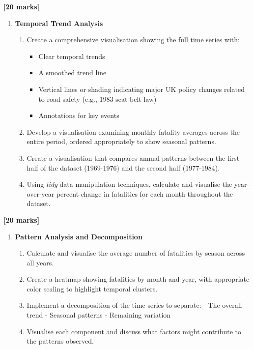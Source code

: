\documentclass[
  10t,
]{article}
\providecommand{\tightlist}{%
  \setlength{\itemsep}{0pt}\setlength{\parskip}{0pt}}\usepackage{longtable,booktabs,array}
\begin{document}
\textbf{{[}20 marks{]}}

\begin{enumerate}
\def\labelenumi{\alph{enumi}.}
\setcounter{enumi}{1}
\tightlist
\item
  \textbf{Temporal Trend Analysis}

  \begin{enumerate}
  \def\labelenumii{\roman{enumii}.}
  \tightlist
  \item
    Create a comprehensive visualisation showing the full time series
    with:

    \begin{itemize}
    \tightlist
    \item
      Clear temporal trends
    \item
      A smoothed trend line
    \item
      Vertical lines or shading indicating major UK policy changes
      related to road safety (e.g., 1983 seat belt law)
    \item
      Annotations for key events
    \end{itemize}
  \item
    Develop a visualisation examining monthly fatality averages across
    the entire period, ordered appropriately to show seasonal patterns.
  \item
    Create a visualisation that compares annual patterns between the
    first half of the dataset (1969-1976) and the second half
    (1977-1984).
  \item
    Using \emph{tidy} data manipulation techniques, calculate and
    visualise the year-over-year percent change in fatalities for each
    month throughout the dataset.
  \end{enumerate}
\end{enumerate}

\textbf{{[}20 marks{]}}

\begin{enumerate}
\def\labelenumi{\alph{enumi}.}
\setcounter{enumi}{2}
\tightlist
\item
  \textbf{Pattern Analysis and Decomposition}

  \begin{enumerate}
  \def\labelenumii{\roman{enumii}.}
  \tightlist
  \item
    Calculate and visualise the average number of fatalities by season
    across all years.
  \item
    Create a heatmap showing fatalities by month and year, with
    appropriate color scaling to highlight temporal clusters.
  \item
    Implement a decomposition of the time series to separate: - The
    overall trend - Seasonal patterns - Remaining variation
  \item
    Visualise each component and discuss what factors might contribute
    to the patterns observed.
  \end{enumerate}
\end{enumerate}
\end{document}
